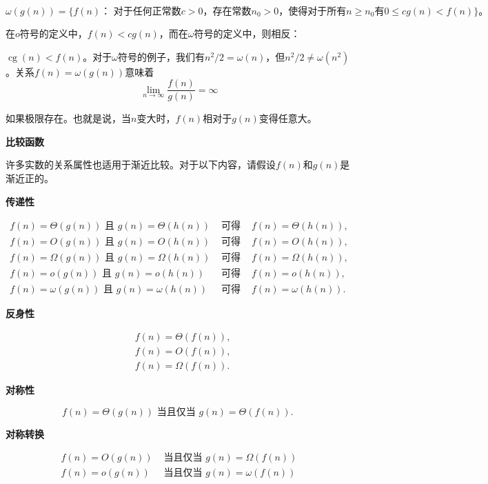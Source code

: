 \documentclass[lang=cn,newtx,10pt,scheme=chinese]{elegantbook}
\begin{document}
$$
\omega(g(n))=\{f(n)：\text { 对于任何正常数} c>0，\text{存在常数} n_0>0 \text {，使得}\text {对于所有} n \geq n_0 \text{有} 0 \leq c g(n)<f(n) \}。
$$

在$o$符号的定义中，$f(n)<c g(n)$，而在$\omega$符号的定义中，则相反：

$\operatorname{cg}(n)<f(n)$。对于$\omega$符号的例子，我们有$n^2 / 2=\omega(n)$，但$n^2 / 2 \neq \omega\left(n^2\right)$。关系$f(n)=\omega(g(n))$意味着
$$
\lim _{n \rightarrow \infty} \frac{f(n)}{g(n)}=\infty
$$

如果极限存在。也就是说，当$n$变大时，$f(n)$相对于$g(n)$变得任意大。

\textbf{比较函数}

许多实数的关系属性也适用于渐近比较。对于以下内容，请假设$f(n)$和$g(n)$是渐近正的。

\textbf{传递性}

\begin{equation*}
\begin{array}{llll}
f(n)=\Theta(g(n)) \text { 且 } g(n)=\Theta(h(n)) & \text { 可得 } & f(n)=\Theta(h(n)), \\
f(n)=O(g(n)) \text { 且 } g(n)=O(h(n)) & \text { 可得 } & f(n)=O(h(n)), \\
f(n)=\Omega(g(n)) \text { 且 } g(n)=\Omega(h(n)) & \text { 可得 } & f(n)=\Omega(h(n)), \\
f(n)=o(g(n)) \text { 且 } g(n)=o(h(n)) & \text { 可得 } & f(n)=o(h(n)), \\
f(n)=\omega(g(n)) \text { 且 } g(n)=\omega(h(n)) & \text { 可得 } & f(n)=\omega(h(n)) .
\end{array}
\end{equation*}

\textbf{反身性}

\begin{equation*}
\begin{aligned}
& f(n)=\Theta(f(n)), \\
& f(n)=O(f(n)), \\
& f(n)=\Omega(f(n)) .
\end{aligned}
\end{equation*}

\textbf{对称性}

$$
f(n)=\Theta(g(n)) \text { 当且仅当 } g(n)=\Theta(f(n)) \text {. }
$$

\textbf{对称转换}

\begin{equation*}
\begin{array}{ll}
f(n)=O(g(n)) & \text { 当且仅当 } g(n)=\Omega(f(n)) \\
f(n)=o(g(n)) & \text { 当且仅当 } g(n)=\omega(f(n))
\end{array}
\end{equation*}
\end{document}
